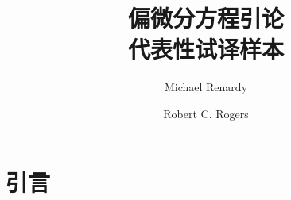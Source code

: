 \documentclass[a4paper,UTF8,12pt]{ctexart}
\title{偏微分方程引论\\代表性试译样本}
\author{Michael Renardy \and Robert C. Rogers}
\date{}
\begin{document}
\maketitle
\color{ZhengWen}
\section{引言}\label{chap:introduction}

\end{document}
